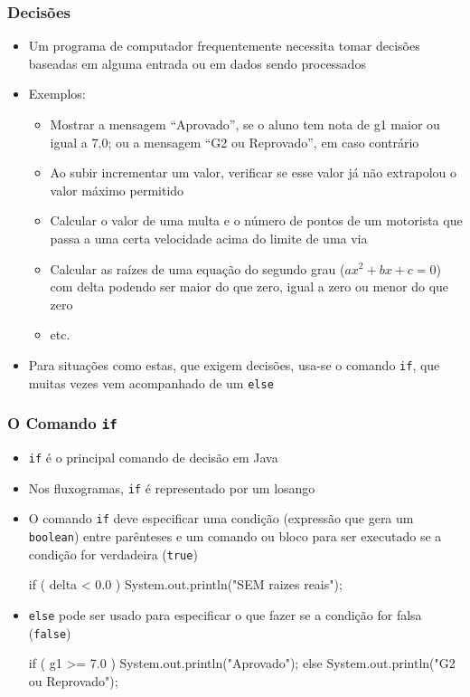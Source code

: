 \documentclass[xcolor={dvipsnames,table},aspectratio=169]{beamer}
\begin{document}
\begin{frame}\frametitle{Decisões}
\begin{itemize}
	\item Um programa de computador frequentemente necessita tomar decisões baseadas em alguma entrada ou em dados sendo processados
	\item Exemplos:
	\begin{itemize}
		\item Mostrar a mensagem ``Aprovado'', se o aluno tem nota de g1 maior ou igual a 7,0; ou a mensagem ``G2 ou Reprovado'', em caso contrário
		\item Ao subir incrementar um valor, verificar se esse valor já não extrapolou o valor máximo permitido
		\item Calcular o valor de uma multa e o número de pontos de um motorista que passa a uma certa velocidade acima do limite de uma via
		\item Calcular as raízes de uma equação do segundo grau ($ax^2 + bx + c = 0$) com delta podendo ser maior do que zero, igual a zero ou menor do que zero
		\item etc.
	\end{itemize}
	\item Para situações como estas, que exigem decisões, usa-se o comando \texttt{if}, que muitas vezes vem acompanhado de um \texttt{else}
\end{itemize}
\end{frame}

\begin{frame}[fragile]\frametitle{O Comando \texttt{if}}
\begin{itemize}
	\item \texttt{if} é o principal comando de decisão em Java
	\item Nos fluxogramas, \texttt{if} é representado por um losango
	\item O comando \texttt{if} deve especificar uma condição (expressão que gera um \texttt{boolean}) entre parênteses e um comando ou bloco para ser executado se a condição for verdadeira (\texttt{true})
\small{
\begin{javacode}
if ( delta < 0.0 )
   System.out.println("SEM raizes reais");
\end{javacode}
}
	\item \texttt{else} pode ser usado para especificar o que fazer se a condição for falsa (\texttt{false})
\small{
\begin{javacode}
if ( g1 >= 7.0 )
   System.out.println("Aprovado");
else
   System.out.println("G2 ou Reprovado");
\end{javacode}
}	
\end{itemize}
\end{frame}
\end{document}
